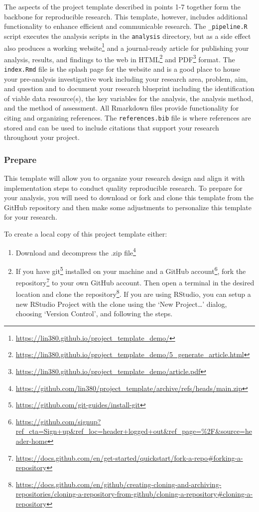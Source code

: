 \documentclass[
]{article}
\DeclareRobustCommand{\href}[2]{#2\footnote{\url{#1}}}
\providecommand{\tightlist}{%
  \setlength{\itemsep}{0pt}\setlength{\parskip}{0pt}}
\begin{document}
The aspects of the project template described in points 1-7 together form the backbone for reproducible research. This template, however, includes additional functionality to enhance efficient and communicable research. The \texttt{\_pipeline.R} script executes the analysis scripts in the \texttt{analysis} directory, but as a side effect also produces \href{https://lin380.github.io/project_template_demo/}{a working website} and a journal-ready article for publishing your analysis, results, and findings to the web in \href{https://lin380.github.io/project_template_demo/5_generate_article.html}{HTML} and \href{https://lin380.github.io/project_template_demo/article.pdf}{PDF} format. The \texttt{index.Rmd} file is the splash page for the website and is a good place to house your pre-analysis investigative work including your research area, problem, aim, and question and to document your research blueprint including the identification of viable data resource(s), the key variables for the analysis, the analysis method, and the method of assessment. All Rmarkdown files provide functionality for citing and organizing references. The \texttt{references.bib} file is where references are stored and can be used to include citations that support your research throughout your project.

\hypertarget{prepare}{%
\subsubsection{Prepare}\label{prepare}}

This template will allow you to organize your research design and align it with implementation steps to conduct quality reproducible research. To prepare for your analysis, you will need to download or fork and clone this template from the GitHub repository and then make some adjustments to personalize this template for your research.

To create a local copy of this project template either:

\begin{enumerate}
\def\labelenumi{\arabic{enumi}.}
\tightlist
\item
  Download and decompress the \href{https://github.com/lin380/project_template/archive/refs/heads/main.zip}{.zip file}
\item
  If you have \href{https://github.com/git-guides/install-git}{git} installed on your machine and a \href{https://github.com/signup?ref_cta=Sign+up\&ref_loc=header+logged+out\&ref_page=\%2F\&source=header-home}{GitHub account}, \href{https://docs.github.com/en/get-started/quickstart/fork-a-repo\#forking-a-repository}{fork the repository} to your own GitHub account. Then open a terminal in the desired location and \href{https://docs.github.com/en/github/creating-cloning-and-archiving-repositories/cloning-a-repository-from-github/cloning-a-repository\#cloning-a-repository}{clone the repository}. If you are using RStudio, you can setup a new RStudio Project with the clone using the `New Project\ldots{}' dialog, choosing `Version Control', and following the steps.
\end{enumerate}
\end{document}
